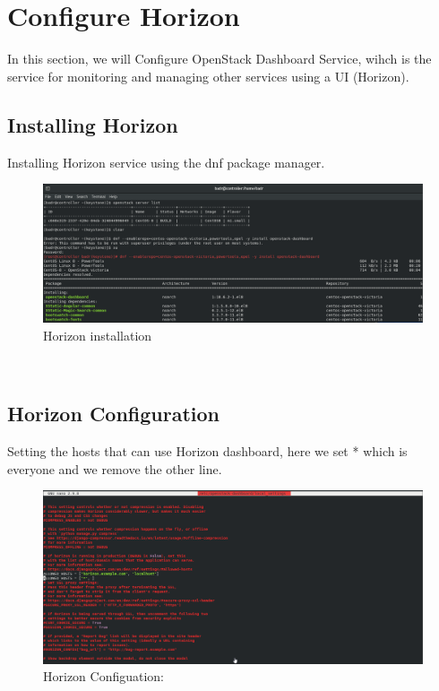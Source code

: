 
\chapter{Configure Horizon}
In this section, we will Configure OpenStack Dashboard Service, wihch is the service for monitoring and managing other services using a UI (Horizon).
\begin{spacing}{1.2}

\section{Installing Horizon}
\par Installing Horizon service using the dnf package manager.
\\
\begin{figure}[!htb] 
\begin{center} 
\includegraphics[width=1\linewidth]{Cloud/Configure Horizon/C_1.png} 
\end{center} 
\caption{ Horizon installation} 
\end{figure} 
\FloatBarrier
\\
\section{Horizon Configuration}
\par Setting the hosts that can use Horizon dashboard, here we set * which is everyone and we remove the other line.
\\
\begin{figure}[!htb] 
\begin{center} 
\includegraphics[width=1\linewidth]{Cloud/Configure Horizon/C_2_conf_1.png} 
\end{center} 
\caption{ Horizon Configuation: } 
\end{figure} 
\FloatBarrier
\\


\end{spacing}
